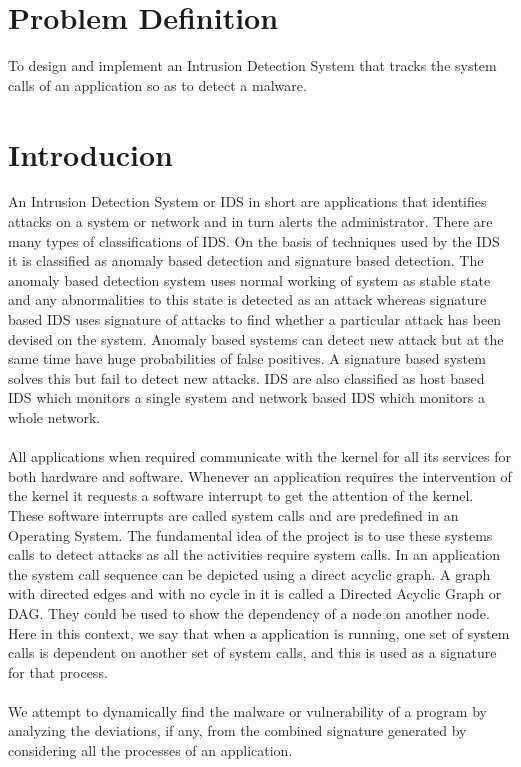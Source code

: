 \section{Problem Definition}

\textsf{To design and implement an Intrusion Detection System that tracks the system calls of an application so as to detect a malware.} \\

\section{Introducion}
An Intrusion Detection System or IDS in short are applications that identifies attacks on a system or network and in turn alerts the administrator. There are many types of classifications of IDS. On the basis of techniques used by the IDS it is classified as anomaly based detection and signature based detection. The anomaly based detection system uses normal working of system as stable state and any abnormalities to this state is detected as an attack whereas signature based IDS uses signature of attacks to find whether a particular attack has been devised on the system. Anomaly based systems can detect new attack but at the same time have huge probabilities of false positives. A signature based system solves this but fail to detect new attacks. IDS are also classified as host based IDS which monitors a single system and network based IDS which monitors a whole network. \\ \\
All applications when required communicate with the kernel for all its services for both hardware and software. Whenever an application requires the intervention of the kernel it requests a software interrupt to get the attention of the kernel. These software interrupts are called system calls and are predefined in an Operating System. The fundamental idea of the project is to use these systems calls to detect attacks as all the activities require system calls. In an application the system call sequence can be depicted using a direct acyclic graph. A graph with directed edges and with no cycle in it is called a Directed Acyclic Graph or DAG. They could be used to show the dependency of a node on another node. Here in this context, we say that when a application is running, one set of system calls is dependent on another set of system calls, and this is used as a signature for that process. \\ \\ 
We attempt to dynamically find the malware or vulnerability of a program by analyzing the deviations, if any, from the combined signature generated by considering all the processes of an application.



